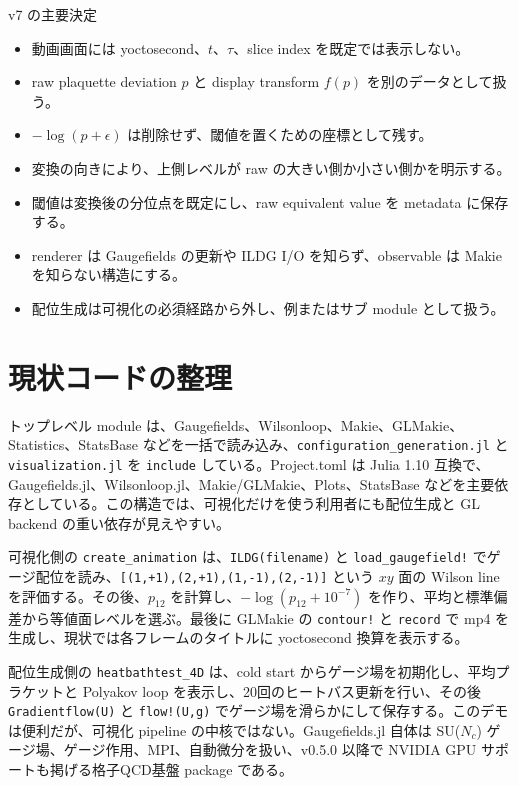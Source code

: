 \documentclass[uplatex,dvipdfmx,ja=standard,11pt,a4paper]{bxjsarticle}
\newcommand{\code}[1]{\texttt{#1}}
\begin{document}
\begin{decisionbox}{v7 の主要決定}
\begin{itemize}[leftmargin=2em]
  \item 動画画面には yoctosecond、\(t\)、\(\tau\)、slice index を既定では表示しない。
  \item raw plaquette deviation \(p\) と display transform \(f(p)\) を別のデータとして扱う。
  \item \(-\log(p+\epsilon)\) は削除せず、閾値を置くための座標として残す。
  \item 変換の向きにより、上側レベルが raw の大きい側か小さい側かを明示する。
  \item 閾値は変換後の分位点を既定にし、raw equivalent value を metadata に保存する。
  \item renderer は Gaugefields の更新や ILDG I/O を知らず、observable は Makie を知らない構造にする。
  \item 配位生成は可視化の必須経路から外し、例またはサブ module として扱う。
\end{itemize}
\end{decisionbox}

\section{現状コードの整理}
トップレベル module は、Gaugefields、Wilsonloop、Makie、GLMakie、Statistics、StatsBase などを一括で読み込み、\code{configuration\_generation.jl} と \code{visualization.jl} を \code{include} している\cite{VisualizingModule}。Project.toml は Julia 1.10 互換で、Gaugefields.jl、Wilsonloop.jl、Makie/GLMakie、Plots、StatsBase などを主要依存としている\cite{VisualizingProject}。この構造では、可視化だけを使う利用者にも配位生成と GL backend の重い依存が見えやすい。

可視化側の \code{create\_animation} は、\code{ILDG(filename)} と \code{load\_gaugefield!} でゲージ配位を読み、\code{[(1,+1),(2,+1),(1,-1),(2,-1)]} という \(xy\) 面の Wilson line を評価する\cite{VisualizingVisualization}。その後、\(p_{12}\) を計算し、\(-\log(p_{12}+10^{-7})\) を作り、平均と標準偏差から等値面レベルを選ぶ。最後に GLMakie の \code{contour!} と \code{record} で mp4 を生成し、現状では各フレームのタイトルに yoctosecond 換算を表示する\cite{VisualizingVisualization}。

配位生成側の \code{heatbathtest\_4D} は、cold start からゲージ場を初期化し、平均プラケットと Polyakov loop を表示し、20回のヒートバス更新を行い、その後 \code{Gradientflow(U)} と \code{flow!(U,g)} でゲージ場を滑らかにして保存する\cite{VisualizingConfig}。このデモは便利だが、可視化 pipeline の中核ではない。Gaugefields.jl 自体は SU(\(N_c\)) ゲージ場、ゲージ作用、MPI、自動微分を扱い、v0.5.0 以降で NVIDIA GPU サポートも掲げる格子QCD基盤 package である\cite{GaugefieldsRepo}。
\end{document}
